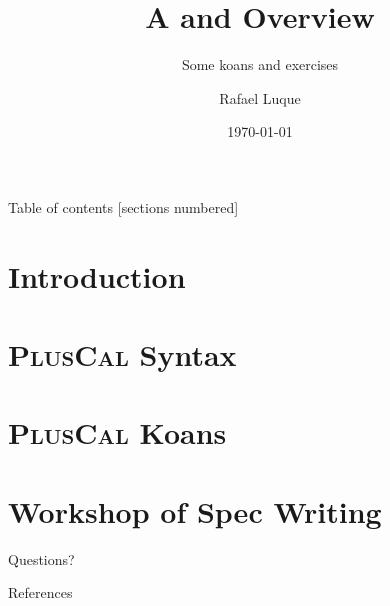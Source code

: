 \documentclass[10pt]{beamer}
\title{A \tlaplus and \pluscal Overview}
\subtitle{Some koans and exercises}
\date{\today}
\author{Rafael Luque}
\institute{OSOCO}
\newcommand{\pluscal}{\textbf{\textsc{PlusCal}}\xspace}
\begin{document}
\maketitle

\begin{frame}{Table of contents}
  [sections numbered]
  \tableofcontents[hideallsubsections]
\end{frame}

\section{Introduction}

\section{\pluscal Syntax}

\section{\pluscal Koans}

\section{Workshop of Spec Writing}


\begin{frame}[standout]
  Questions?
\end{frame}

\appendix

\begin{frame}[allowframebreaks]{References}

  \nocite{*}
  
  

\end{frame}
\end{document}
